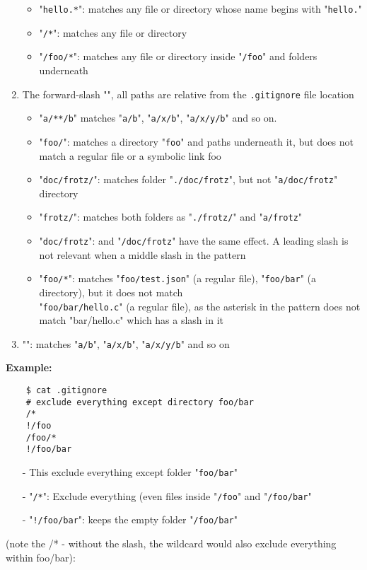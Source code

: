 \begin{enumerate}
\begin{itemize}
		      \item "\texttt{hello.*}": matches any file or directory whose name begins with "\texttt{hello.}"
		      \item "\texttt{/*}": matches any file or directory
		      \item "\texttt{/foo/*}": matches any file or directory inside "\texttt{/foo}" and folders underneath
	      \end{itemize}
	\item The forward-slash "\TT{/}", all paths are relative from the \texttt{.gitignore} file location
	      \begin{itemize}\packed
		      \item "\texttt{a/**/b}" matches "\texttt{a/b}", "\texttt{a/x/b}", "\texttt{a/x/y/b}" and so on.
		      \item "\texttt{foo/}": matches a directory "\texttt{foo}" and paths underneath it, but does not match a regular file or a symbolic link foo
		      \item "\texttt{doc/frotz/}": matches folder "\texttt{./doc/frotz}", but not "\texttt{a/doc/frotz}" directory
		      \item "\texttt{frotz/}": matches both folders as "\texttt{./frotz/}" and "\texttt{a/frotz}"
		      \item "\texttt{doc/frotz}": and "\texttt{/doc/frotz}" have the same effect. A leading slash is not relevant when a middle slash in the pattern
		      \item "\texttt{foo/*}": matches "\texttt{foo/test.json}" (a regular file), "\texttt{foo/bar}" (a directory), but it does not match \\
		            "\texttt{foo/bar/hello.c}" (a regular file), as the asterisk in the pattern does not match "bar/hello.c" which has a slash in it
	      \end{itemize}
	\item "": matches "\texttt{a/b}", "\texttt{a/x/b}", "\texttt{a/x/y/b}" and so on
\end{enumerate}

\nl\textbf{Example:}
\begin{verbatim}
    $ cat .gitignore
    # exclude everything except directory foo/bar
    /*
    !/foo
    /foo/*
    !/foo/bar
\end{verbatim}
\begin{itemize}\packed
	\item[-] This exclude everything except folder "\texttt{foo/bar}"
	\item[-] "\texttt{/*}": Exclude everything (even files inside "\texttt{/foo}" and "\texttt{/foo/bar}"
	\item[-] "\texttt{!/foo/bar}": keeps the empty folder "\texttt{/foo/bar}"
\end{itemize}
(note the /* - without the slash, the wildcard would also exclude everything within foo/bar):

